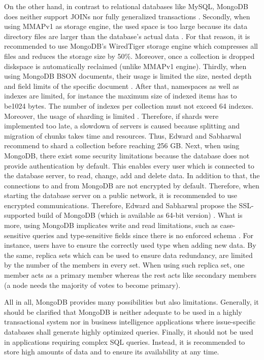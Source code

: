 On the other hand, in contrast to relational databases like MySQL, MongoDB does neither support JOINs nor fully generalized transactions \cite[p.25 ff.]{mongodb_edward}. Secondly, when using MMAPv1 as storage engine, the used space is too large because its data directory files are larger than the database's actual data \cite[p.226 ff.]{mongodb_edward}. For that reason, it is recommended to use MongoDB's WiredTiger storage engine which compresses all files and reduces the storage size by 50\%. Moreover, once a collection is dropped diskspace is automatically reclaimed (unlike MMAPv1 engine).
Thirdly, when using MongoDB BSON documents, their usage is limited the size, nested depth and field limits of the specific document \cite[p.228 ff.]{mongodb_edward}. After that, namespaces as well as indexes are limited, for instance the maximum size of indexed items has to be1024 bytes. The number of indexes per collection must not exceed 64 indexes. Moreover, the usage of sharding is limited \cite[p.230 ff.]{mongodb_edward}. Therefore, if shards were implemented too late, a slowdown of servers is caused because splitting and migration of chunks takes time and resources. Thus, Edward and Sabharwal  recommend to shard a collection before reaching 256 \ac{GB}. 
Next, when using MongoDB, there exist some security limitations because the database does not provide authentication by default. This enables every user which is connected to the database server, to read, change, add and delete data. In addition to that, the connections to and from MongoDB are not encrypted by default. Therefore, when starting the database server on a public network, it is recommended to use encrypted communications. Therefore, Edward and Sabharwal propose the SSL-supported build of MongoDB (which is available as 64-bit version) \cite[p.230 ff.]{mongodb_edward}. What is more, using MongoDB implicates write and read limitations, such as case-sensitive queries and type-sensitive fields since there is no enforced schema \cite[p.231 ff.]{mongodb_edward}. For instance, users have to ensure the correctly used type when adding new data. By the same, replica sets which can be used to ensure data redundancy, are limited by the number of the members in every set. When using such replica set, one member acts as a primary member whereas the rest acts like secondary members (a node needs the majority of votes to become primary).

All in all, MongoDB provides many possibilities but also limitations. Generally, it should be clarified that MongoDB is neither adequate to be used in a highly transactional system nor in business intelligence applications where issue-specific databases shall generate highly optimized queries. Finally, it should not be used in applications requiring complex SQL queries. Instead, it is recommended to store high amounts of data and to ensure its availability at any time. 

